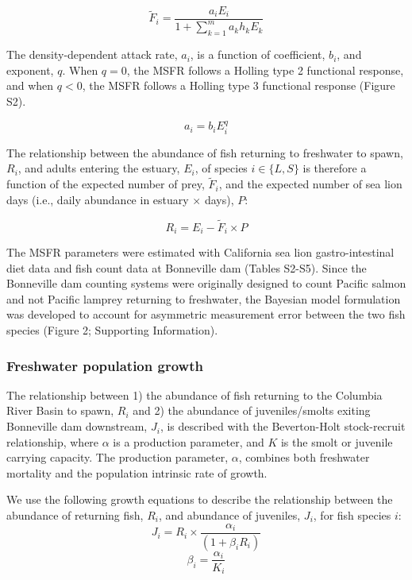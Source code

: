 \documentclass{article}
\begin{document}
\begin{equation}
\widetilde{F}_i = \frac{a_iE_i}{1+\sum_{k=1}^{m}a_kh_kE_k}    
\end{equation}

The density-dependent attack rate, $a_i$, is a function of coefficient, $b_i$, and exponent, $q$. When $q = 0$, the MSFR follows a Holling type 2 functional response, and when $q < 0$, the MSFR follows a Holling type 3 functional response (Figure S2). 

\begin{equation}
a_i = b_iE_i^q    
\end{equation}

The relationship between the abundance of fish returning to freshwater to spawn, $R_i$, and adults entering the estuary, $E_i$, of species $i \in \{L, S\}$ is therefore a function of the expected number of prey, $\widetilde{F}_i$, and the expected number of sea lion days (i.e., daily abundance in estuary $\times$ days), $P$:

\begin{equation}
R_i = E_i - \widetilde{F}_i \times P  
\end{equation}

The MSFR parameters were estimated with California sea lion gastro-intestinal diet data and fish count data at Bonneville dam (Tables S2-S5). Since the Bonneville dam counting systems were originally designed to count Pacific salmon and not Pacific lamprey returning to freshwater, the Bayesian model formulation was developed to account for asymmetric measurement error between the two fish species (Figure 2; Supporting Information).

\subsubsection*{Freshwater population growth}

The relationship between 1) the abundance of fish returning to the Columbia River Basin to spawn, $R_i$ and 2) the abundance of juveniles/smolts exiting Bonneville dam downstream, $J_i$, is described with the Beverton-Holt stock-recruit relationship, where $\alpha$ is a production parameter, and $K$ is the smolt or juvenile carrying capacity. The production parameter, $\alpha$, combines both freshwater mortality and the population intrinsic rate of growth.

We use the following growth equations to describe the relationship between the abundance of returning fish, $R_i$, and abundance of juveniles, $J_i$, for fish species $i$:
\begin{equation}
J_i = R_i \times \frac{\alpha_i}{(1+\beta_iR_i)}
\end{equation}
\begin{equation}
\beta_i = \frac{\alpha_i}{K_i}
\end{equation}
\end{document}
